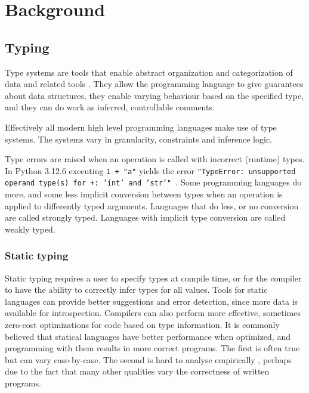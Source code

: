 \chapter{Background\label{background}}

\section{Typing}

Type systems are tools that enable abstract organization and categorization of data and related tools \cite{programming_langs}. They allow the programming language to give guarantees about data structures, they enable varying behaviour based on the specified type, and they can do work as inferred, controllable comments.

Effectively all modern high level programming languages make use of type systems. The systems vary in granularity, constraints and inference logic. 

Type errors are raised when an operation is called with incorrect (runtime) types. In Python 3.12.6 executing {\tt 1 + "a"} yields the error {\tt "TypeError: unsupported operand type(s) for +: 'int' and 'str'" }. Some programming languages do more, and some less implicit conversion between types when an operation is applied to differently typed arguments. Languages that do less, or no conversion are called strongly typed. Languages with implicit type conversion are called weakly typed. 


\subsection{Static typing}
Static typing requires a user to specify types at compile time, or for the compiler to have the ability to correctly infer types for all values. Tools for static languages can provide better suggestions and error detection, since more data is available for introspection. Compilers can also perform more effective, sometimes zero-cost optimizations for code based on type information. It is commonly believed that statical languages have better performance when optimized, and programming with them results in more correct programs. The first is often true but can vary case-by-case.  The second is hard to analyse empirically \cite{codequality_reproudction_2019}, perhaps due to the fact that  many other qualities vary the correctness of written programs. 

